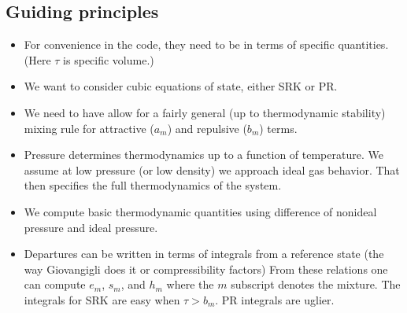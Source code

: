 \documentclass[11pt]{article}
\begin{document}
\subsection{Guiding principles}
\begin{itemize}
    \item For convenience in the code, they need to be in terms of specific quantities. (Here $\tau$ is specific volume.)
    \item We want to consider cubic equations of state, either SRK or PR. 
    \item We need to have allow for a
        fairly general (up to thermodynamic stability) mixing rule for attractive ($a_m$) and repulsive ($b_m$)
        terms. 
    \item Pressure determines thermodynamics up to a function of temperature.  
        We assume at low pressure (or low density) we approach ideal gas behavior.  That then specifies
        the full thermodynamics of the system.
    \item We compute basic thermodynamic quantities using difference of nonideal pressure and ideal pressure.
    \item Departures can be written in terms of integrals from a reference state (the way Giovangigli does it or compressibility factors)
        From these relations one can compute $e_m$, $s_m$, and $h_m$ where the $m$ subscript denotes the mixture.
        The integrals for SRK are easy when $\tau > b_m$.  PR integrals are uglier.  
\end{itemize}
\end{document}
